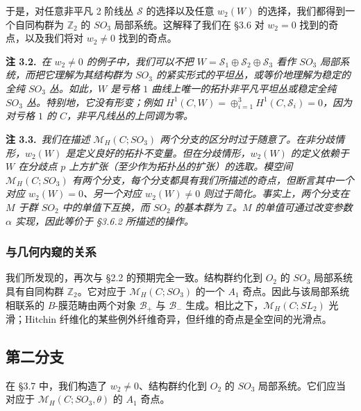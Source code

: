 于是，对任意非平凡 2 阶线丛 $\mathcal{S}$ 的选择以及任意 $w_2(W)$ 的选择，我们都得到一个自同构群为 $\mathbb{Z}_2$ 的 $SO_3$ 局部系统。这解释了我们在 §3.6 对 $w_2=0$ 找到的奇点，以及我们将对 $w_2\ne0$ 找到的奇点。

\par\medskip
\noindent\textbf{注 3.2.}\ \textit{在 $w_2\ne0$ 的例子中，我们可以不把 $W=\mathcal{S}_1\oplus\mathcal{S}_2\oplus\mathcal{S}_3$ 看作 $SO_3$ 局部系统，而把它理解为其结构群为 $SO_3$ 的紧实形式的平坦丛，或等价地理解为稳定的全纯 $SO_3$ 丛。如此，$W$ 是亏格 $1$ 曲线上唯一的拓扑非平凡平坦丛或稳定全纯 $SO_3$ 丛。特别地，它没有形变；例如 $H^1(C,W)=\oplus_{i=1}^3H^1(C,\mathcal{S}_i)=0$，因为对亏格 $1$ 的 $C$，非平凡线丛的上同调为零。}
\par\medskip

\par\medskip
\noindent\textbf{注 3.3.}\ \textit{我们在描述 $\mathcal{M}_H(C;SO_3)$ 两个分支的区分时过于随意了。在非分歧情形，$w_2(W)$ 是定义良好的拓扑不变量。但在分歧情形，$w_2(W)$ 的定义依赖于 $W$ 在分歧点 $p$ 上方扩张（至少作为拓扑丛的扩张）的选取。模空间 $\mathcal{M}_H(C;SO_3)$ 有两个分支，每个分支都具有我们所描述的奇点，但断言其中一个对应 $w_2(W)=0$、另一个对应 $w_2(W)\ne0$ 则过于简化。事实上，两个分支在 $M$ 于群 $SO_2$ 中的单值下互换，而 $SO_2$ 的基本群为 $\mathbb{Z}$。$M$ 的单值可通过改变参数 $\alpha$ 实现，因此等价于 §3.6.2 所描述的操作。}
\par\medskip

\subsubsection{与几何内窥的关系}

我们所发现的，再次与 §2.2 的预期完全一致。结构群约化到 $O_2$ 的 $SO_3$ 局部系统具有自同构群 $\mathbb{Z}_2$。它对应于 $\mathcal{M}_H(C;SO_3)$ 的一个 $A_1$ 奇点。因此与该局部系统相联系的 $B$-膜范畴由两个对象 $\mathcal{B}_+$ 与 $\mathcal{B}_-$ 生成。相比之下，$\mathcal{M}_H(C;SL_2)$ 光滑；Hitchin 纤维化的某些例外纤维奇异，但纤维的奇点是全空间的光滑点。

\subsection{第二分支}

在 §3.7 中，我们构造了 $w_2\ne0$、结构群约化到 $O_2$ 的 $SO_3$ 局部系统。它们应当对应于 $\mathcal{M}_H(C;SO_3,\theta)$ 的 $A_1$ 奇点。


